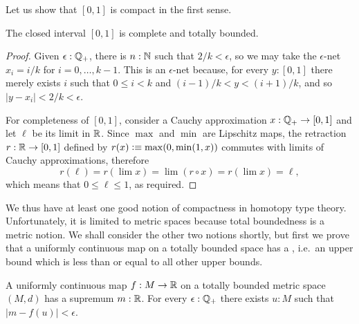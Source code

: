 Let us show that $[0,1]$ is compact in the first sense.

\begin{thm} \label{analysis-interval-ctb}
  The closed interval $[0,1]$ is complete and totally bounded.
\end{thm}

\begin{proof}
  Given $\epsilon : \mathbb{Q}_{+}$, there is $n : \mathbb{N}$ such that $2/k < \epsilon$, so we may take the
  $\epsilon$-net $x_i = i/k$ for $i = 0, \ldots, k-1$. This is an $\epsilon$-net because,
  for every $y : [0,1]$ there merely exists $i$ such that $0 \leq i < k$ and $(i -
  1)/k < y < (i+1)/k$, and so $|y - x_i| < 2/k < \epsilon$.

  For completeness of $[0,1]$, consider a Cauchy approximation $x : \mathbb{Q}_{+} \to
  [0,1]$ and let $\ell$ be its limit in $\mathbb{R}$. Since $\max$ and $\min$ are Lipschitz maps,
  the retraction $r : \mathbb{R} \to [0,1]$ defined by $r(x) \vcentcolon\equiv \max(0, \min(1, x))$ commutes
  with limits of Cauchy approximations, therefore
  \begin{equation*}
    r(\ell) =
    r (\lim x) =
    \lim (r \circ x) =
    r (\lim x) =
    \ell,
  \end{equation*}
  which means that $0 \leq \ell \leq 1$, as required.
\end{proof}

We thus have at least one good notion of compactness in homotopy type theory.
Unfortunately, it is limited to metric spaces because total boundedness is a metric
notion. We shall consider the other two notions shortly, but first we prove that a
uniformly continuous map on a totally bounded space has a ,
%
i.e.\ an upper bound which is less than or equal to all other upper bounds.

\begin{thm} \label{ctb-uniformly-continuous-sup}
  A uniformly continuous map $f : M \to \mathbb{R}$ on a totally bounded metric space
  $(M, d)$ has a supremum $m : \mathbb{R}$. For every $\epsilon : \mathbb{Q}_{+}$ there exists $u : M$ such
  that $|m - f(u)| < \epsilon$.
\end{thm}

